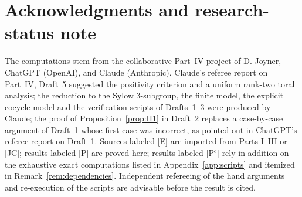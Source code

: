 \documentclass[11pt]{article}
\theoremstyle{plain}
\theoremstyle{definition}
\begin{document}
\section*{Acknowledgments and research-status note}
The computations stem from the collaborative Part~IV project of
D. Joyner, ChatGPT (OpenAI), and Claude (Anthropic).  Claude's
referee report on Part~IV, Draft~5 suggested the positivity
criterion and a uniform rank-two toral analysis; the reduction to the
Sylow $3$-subgroup, the finite model, the explicit cocycle model and
the verification scripts of Drafts~1--3 were produced by Claude;
the proof of Proposition~\ref{prop:H1} in Draft~2 replaces a
case-by-case argument of Draft~1 whose first case was incorrect, as
pointed out in ChatGPT's referee report on Draft~1.  Sources
labeled [E] are imported from Parts I--III or [JC]; results labeled
[P] are proved here; results labeled [P$^{\mathrm c}$] rely in addition
on the exhaustive exact computations listed in Appendix~\ref{app:scripts}
and itemized in Remark~\ref{rem:dependencies}.  Independent refereeing of the hand arguments and
re-execution of the scripts are advisable before the result is cited.
\end{document}
